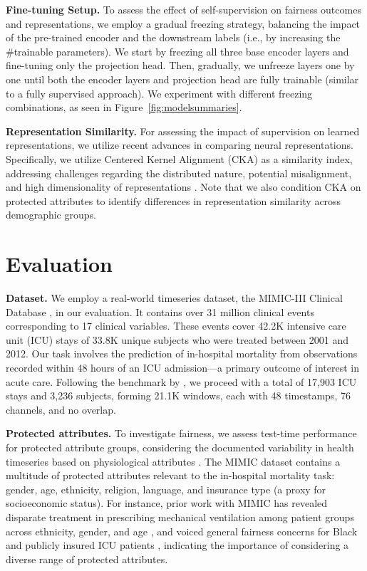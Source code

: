 \documentclass[letterpaper]{article} %
\begin{document}
\smallskip
\noindent\textbf{Fine-tuning Setup.} To assess the effect of self-supervision on fairness outcomes and representations, we employ a gradual freezing strategy, balancing the impact of the pre-trained encoder and the downstream labels (i.e., by increasing the  \#trainable parameters). We start by freezing all three base encoder layers and fine-tuning only the projection head. Then, gradually, we unfreeze layers one by one until both the encoder layers and projection head are fully trainable (similar to a fully supervised approach). We experiment with different freezing combinations, as seen in Figure~\ref{fig:modelsummaries}.\hfill
\smallskip

\noindent\textbf{Representation Similarity.}
For assessing the impact of supervision on learned representations, we utilize recent advances in comparing neural representations. Specifically, we utilize Centered Kernel Alignment (CKA) as a similarity index, addressing challenges regarding the distributed nature, potential misalignment, and high dimensionality of representations \cite{kornblith2019similarity}. Note that we also condition CKA on protected attributes to identify differences in representation similarity across demographic groups.

\section{Evaluation}
\label{sec:evaluation}


\noindent\textbf{Dataset.} We employ a real-world timeseries dataset, the MIMIC-III Clinical Database \cite{johnson2016mimic}, in our evaluation. It contains over 31 million clinical events corresponding to 17 clinical variables.
These events cover 42.2K intensive care unit (ICU) stays of 33.8K unique subjects who were treated between 2001 and 2012. Our task involves the prediction of in-hospital mortality from observations recorded within 48 hours of an ICU admission---a primary outcome of interest in acute care. Following the benchmark by \citet{harutyunyan2019multitask}, we proceed with a total of 17,903 ICU stays and 3,236 subjects, forming 21.1K windows, each with 48 timestamps, 76 channels, and no overlap.


\smallskip
\noindent\textbf{Protected attributes.} To investigate fairness, we assess test-time performance for protected attribute groups, considering the documented variability in health timeseries based on physiological attributes \cite{spathis2021self}.
The MIMIC dataset contains a multitude of protected attributes relevant to the in-hospital mortality task: gender, age, ethnicity, religion, language, and insurance type (a proxy for socioeconomic status). For instance, prior work with MIMIC has revealed disparate treatment in prescribing mechanical ventilation among patient groups across ethnicity, gender, and age \cite{meng2022interpretability}, and voiced general fairness concerns for Black and publicly insured ICU patients \cite{roosli2022peeking}, indicating the importance of considering a diverse range of protected attributes.
\smallskip
\end{document}
